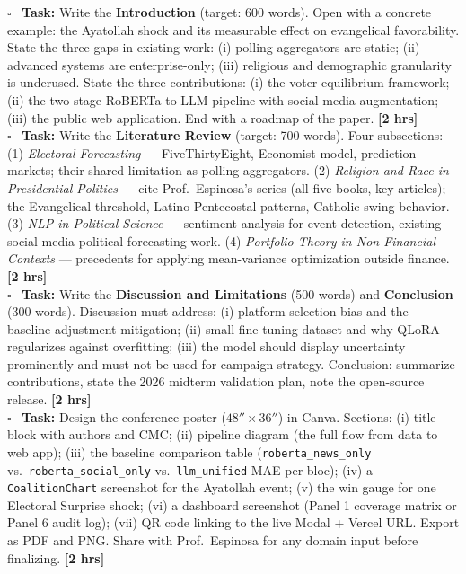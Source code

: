 \documentclass[11pt]{article}
\newcommand{\hrs}[1]{\textbf{[#1 hrs]}}
\newcommand{\task}[2]{%
  \noindent\textbf{Task:} #1 \hfill \hrs{#2}\\}
\newcommand{\done}{\textcolor{sectionblue}{$\square$}\ }
\begin{document}
\begin{taskbox}
\done \task{Write the \textbf{Introduction} (target: 600 words). Open with
  a concrete example: the Ayatollah shock and its measurable effect on
  evangelical favorability. State the three gaps in existing work: (i)
  polling aggregators are static; (ii) advanced systems are enterprise-only;
  (iii) religious and demographic granularity is underused. State the
  three contributions: (i) the voter equilibrium framework; (ii) the
  two-stage RoBERTa-to-LLM pipeline with social media augmentation;
  (iii) the public web application. End with a roadmap of the paper.}{2}

\done \task{Write the \textbf{Literature Review} (target: 700 words).
  Four subsections: (1) \textit{Electoral Forecasting} --- FiveThirtyEight,
  Economist model, prediction markets; their shared limitation as polling
  aggregators. (2) \textit{Religion and Race in Presidential Politics} ---
  cite Prof.\ Espinosa's series (all five books, key articles); the Evangelical
  threshold, Latino Pentecostal patterns, Catholic swing behavior.
  (3) \textit{NLP in Political Science} --- sentiment analysis for event
  detection, existing social media political forecasting work.
  (4) \textit{Portfolio Theory in Non-Financial Contexts} --- precedents
  for applying mean-variance optimization outside finance.}{2}

\done \task{Write the \textbf{Discussion and Limitations} (500 words) and
  \textbf{Conclusion} (300 words). Discussion must address: (i) platform
  selection bias and the baseline-adjustment mitigation; (ii) small
  fine-tuning dataset and why QLoRA regularizes against overfitting;
  (iii) the model should display uncertainty prominently and must not be
  used for campaign strategy. Conclusion: summarize contributions, state
  the 2026 midterm validation plan, note the open-source release.}{2}

\done \task{Design the conference poster ($48'' \times 36''$) in Canva.
  Sections: (i) title block with authors and CMC; (ii) pipeline diagram
  (the full flow from data to web app); (iii) the baseline comparison table
  (\texttt{roberta\_news\_only} vs.\ \texttt{roberta\_social\_only} vs.\
  \texttt{llm\_unified} MAE per bloc); (iv) a \texttt{CoalitionChart} screenshot for the
  Ayatollah event; (v) the win gauge for one Electoral Surprise shock;
  (vi) a dashboard screenshot (Panel 1 coverage matrix or Panel 6 audit log);
  (vii) QR code linking to the live Modal + Vercel URL. Export as PDF and PNG.
  Share with Prof.\ Espinosa for any domain input before finalizing.}{2}
\end{taskbox}
\end{document}
